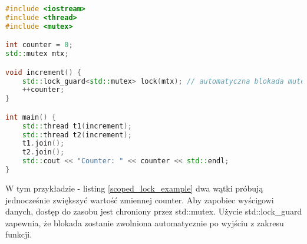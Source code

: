 \begin{lstlisting}[language=C++, caption={Przykład użycia std::scoped\_lock}, label={scoped_lock_example}]
#include <iostream>
#include <thread>
#include <mutex>

int counter = 0;
std::mutex mtx;

void increment() {
    std::lock_guard<std::mutex> lock(mtx); // automatyczna blokada mutexu
    ++counter;
}

int main() {
    std::thread t1(increment);
    std::thread t2(increment);
    t1.join();
    t2.join();
    std::cout << "Counter: " << counter << std::endl;
}
\end{lstlisting}
W tym przykładzie - listing \ref{scoped_lock_example} dwa wątki próbują jednocześnie zwiększyć wartość zmiennej counter. Aby zapobiec wyścigowi danych, dostęp do zasobu jest chroniony przez std::mutex. Użycie std::lock\_guard zapewnia, że blokada zostanie zwolniona automatycznie po wyjściu z zakresu funkcji.

